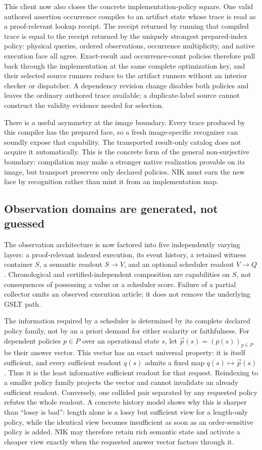 \documentclass[11pt]{article}
\begin{document}
This client now also closes the concrete implementation-policy square.  One
valid authored assertion occurrence compiles to an artifact state whose trace
is read as a proof-relevant lookup receipt.  The receipt returned by running
that compiled trace is equal to the receipt returned by the uniquely strongest
prepared-index policy: physical queries, ordered observations, occurrence
multiplicity, and native execution face all agree.  Exact-result and
occurrence-count policies therefore pull back through the implementation at the
same complete optimization key, and their selected source runners reduce to
the artifact runners without an interior checker or dispatcher.  A dependency
revision change disables both policies and leaves the ordinary authored trace
available; a duplicate-label source cannot construct the validity evidence
needed for selection.

There is a useful asymmetry at the image boundary.  Every trace produced by
this compiler has the prepared face, so a fresh image-specific recognizer can
soundly expose that capability.  The transported result-only catalog does not
acquire it automatically.  This is the concrete form of the general
non-surjective boundary: compilation may make a stronger native realization
provable on its image, but transport preserves only declared policies.  NIK
must earn the new face by recognition rather than mint it from an implementation
map.

\subsection{Observation domains are generated, not guessed}

The observation architecture is now factored into five independently varying
layers: a proof-relevant indexed execution, its event history, a retained
witness container $S$, a semantic readout $S\to V$, and an optional scheduler
readout $V\to Q$.  Chronological and certified-independent composition are
capabilities on $S$, not consequences of possessing a value or a scheduler
score.  Failure of a partial collector omits an observed execution article; it
does not remove the underlying GSLT path.

The information required by a scheduler is determined by its complete declared
policy family, not by an a priori demand for either scalarity or faithfulness.
For dependent policies $p\in P$ over an operational state $s$, let
$\vec p(s)=(p(s))_{p\in P}$ be their answer vector.  This vector has an exact
universal property: it is itself sufficient, and every sufficient readout
$q(s)$ admits a fixed map $q(s)\mapsto\vec p(s)$.  Thus it is the least
informative sufficient readout for that request.  Reindexing to a smaller
policy family projects the vector and cannot invalidate an already sufficient
readout.  Conversely, one collided pair separated by any requested policy
refutes the whole readout.  A concrete history model shows why this is sharper
than ``lossy is bad'': length alone is a lossy but sufficient view for a
length-only policy, while the identical view becomes insufficient as soon as
an order-sensitive policy is added.  NIK may therefore retain rich semantic
state and activate a cheaper view exactly when the requested answer vector
factors through it.
\end{document}
